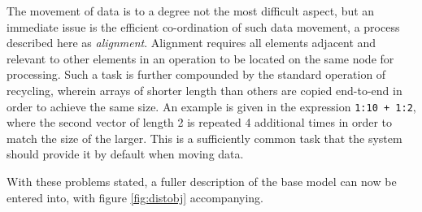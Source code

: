 The movement of data is to a degree not the most difficult aspect, but an
immediate issue is the efficient co-ordination of such data movement, a process
described here as \textit{alignment}.
Alignment requires all elements adjacent and relevant to other elements in an
operation to be located on the same node for processing.
Such a task is further compounded by the standard operation of recycling,
wherein arrays of shorter length than others are copied end-to-end in order to
achieve the same size.
An example is given in the expression \texttt{1:10 + 1:2}, where
the second vector of length 2 is repeated 4 additional times in order to match
the size of the larger.
This is a sufficiently common task that the system should provide it by default
when moving data.

With these problems stated, a fuller description of the base model can now be
entered into, with figure \ref{fig:distobj} accompanying.

